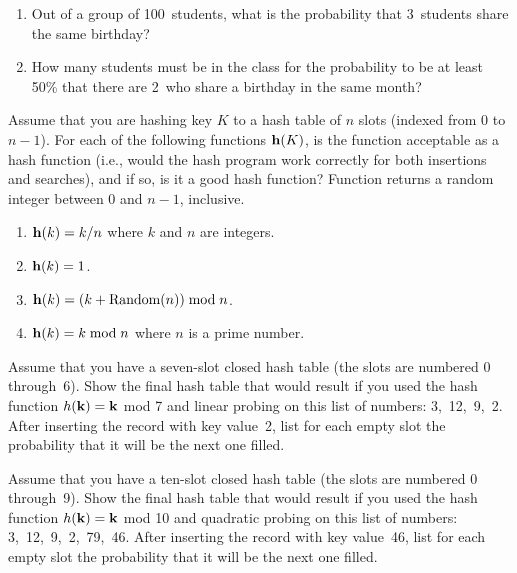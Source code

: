 \begin{exercises}
\begin{enumerate}
\item Out of a group of 100~students, what is the probability that
3~students share the same birthday?

\item How many students must be in the class for the probability
to be at least 50\% that there are 2~who share a birthday in the
same month?
\end{enumerate}

\item
Assume that you are hashing key \(K\) to a hash table of \(n\) slots
(indexed from 0 to \(n-1\)).
For each of the following functions \({\bf h}(K)\), is the function
acceptable as a hash function (i.e., would the hash program work
correctly for both insertions and searches), and if so, is it a good
hash function?
Function  returns a random integer between 0 and
\(n-1\), inclusive.

\begin{enumerate}
\item
\({\bf h}(k) = k/n\) where \(k\) and \(n\) are integers.

\item
\({\bf h}(k) = 1\).

\item
\({\bf h}(k) = (k + \mbox{Random}(n)) \bmod n\).

\item
\({\bf h}(k) = k \bmod n\) where \(n\) is a prime number.
\end{enumerate}

\item
Assume that you have a seven-slot closed hash table
(the slots are numbered 0 through~6).
Show the final hash table that would result if you used
the hash function \(h({\bf k}) = {\bf k}\) mod 7 and linear probing
on this list of numbers: 3,~12,~9,~2.
After inserting the record with key value~2, list for each empty slot
the probability that it will be the next one filled.

\item
Assume that you have a ten-slot closed hash table
(the slots are numbered 0 through~9).
Show the final hash table that would result if you used
the hash function \(h({\bf k}) = {\bf k}\) mod 10 and quadratic probing
on this list of numbers: 3,~12,~9,~2,~79,~46.
After inserting the record with key value~46, list for each empty slot
the probability that it will be the next one filled.


\end{exercises}

